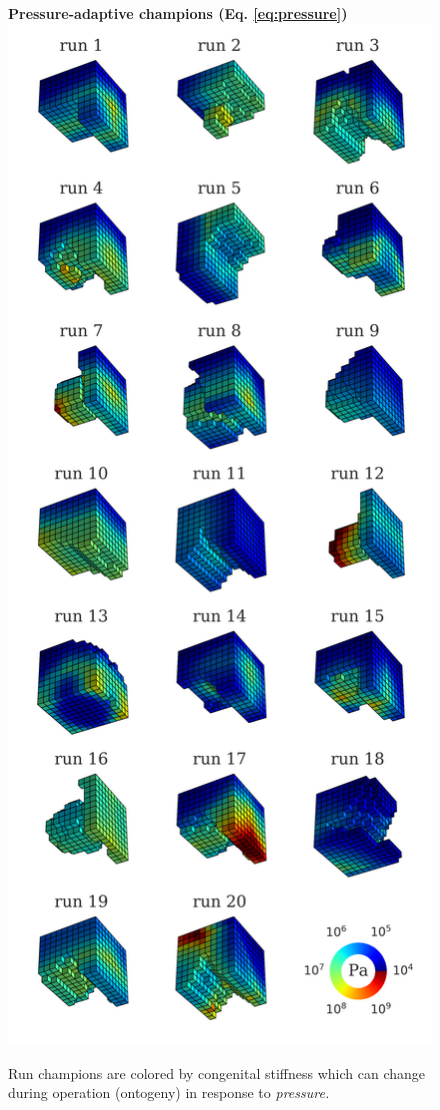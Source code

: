 \begin{figure}%
\centering
{\large \textbf{Pressure-adaptive champions (Eq. \ref{eq:pressure})}}
\includegraphics[width=0.5\linewidth]{Chapter06/img/pressure_run_champs}
\caption{\label{fig6:pressure} Run champions are colored by congenital stiffness which can change during operation (ontogeny) in response to \textit{pressure.}}
\end{figure}



